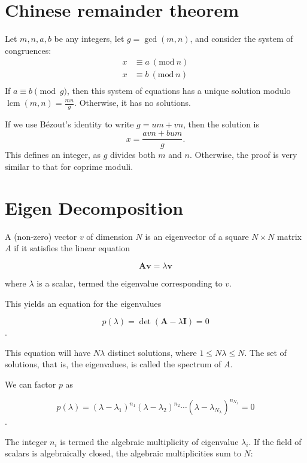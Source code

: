 \documentclass[a4paper]{article}
\newcommand{\Mod}[1]{\ (\mathrm{mod}\ #1)}
\begin{document}
\begin{landscape}
\begin{multicols}{2}

\section{Chinese remainder theorem}
Let $m,n,a,b$ be any integers, let $g=\gcd(m,n)$, and consider the system of congruences:
\begin{align*}
  x &\equiv a \Mod{n} \\
  x &\equiv b \Mod{n} \\
\end{align*}
If $a \equiv b{\pmod {g}}$, then this system of equations has a unique solution modulo $\operatorname{lcm} (m,n)= \frac{mn}{g}$. Otherwise, it has no solutions.

If we use Bézout's identity to write  $g=um+vn$, then the solution is
$${\displaystyle x={\frac {avn+bum}{g}}.}$$
This defines an integer, as $g$ divides both $m$ and $n$. Otherwise, the proof is very similar to that for coprime moduli.

\section{Eigen Decomposition}
A (non-zero) vector $v$ of dimension $N$ is an eigenvector of a square $N \times N$ matrix $A$ if it satisfies the linear equation

$$ \mathbf {A} \mathbf {v} =\lambda \mathbf {v} $$

where $\lambda$ is a scalar, termed the eigenvalue corresponding to $v$.

This yields an equation for the eigenvalues

$$p\left(\lambda \right)=\det \left(\mathbf {A} -\lambda \mathbf {I} \right)=0$$.

This equation will have $N\lambda$ distinct solutions, where $1 \leq N\lambda \leq N$. The set of solutions, that is, the eigenvalues, is called the spectrum of $A$.

We can factor $p$ as

$$p\left(\lambda \right)=\left(\lambda -\lambda _{1}\right)^{n_{1}}\left(\lambda -\lambda _{2}\right)^{n_{2}}\cdots \left(\lambda -\lambda _{N_{\lambda }}\right)^{n_{N_{\lambda }}}=0$$.

The integer $n_i$ is termed the algebraic multiplicity of eigenvalue $\lambda_i$. If the field of scalars is algebraically closed, the algebraic multiplicities sum to $N$:


\end{multicols}
\end{landscape}
\end{document}
